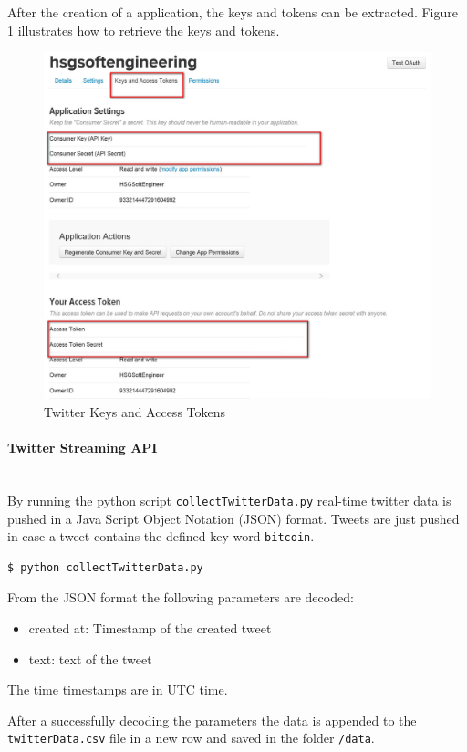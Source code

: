 \documentclass[a4paper,12pt]{article}
\begin{document}
\begin{spacing}{1.2}
After the creation of a application, the keys and tokens can be extracted. Figure 1 illustrates how to retrieve the keys and tokens.
\begin{figure}[h]
\centering
\includegraphics[scale=0.6]{twitteraccess}
\caption{Twitter Keys and Access Tokens}
\end{figure}

\paragraph{Twitter Streaming API}\mbox{}\\{}
By running the python script \verb|collectTwitterData.py| real-time twitter data is pushed in a Java Script Object Notation (JSON) format. Tweets are just pushed in case a tweet contains the defined key word \verb|bitcoin|.
\begin{lstlisting}[language=bash]
$ python collectTwitterData.py
\end{lstlisting}

From the JSON format the following parameters are decoded:
\begin{itemize}
    \item created at: Timestamp of the created tweet
    \item text: text of the tweet
\end{itemize}
The time timestamps are in UTC time.

After a successfully decoding the parameters the data is appended to the \verb|twitterData.csv| file in a new row and saved in the folder \verb|/data|.


\end{spacing}
\end{document}
